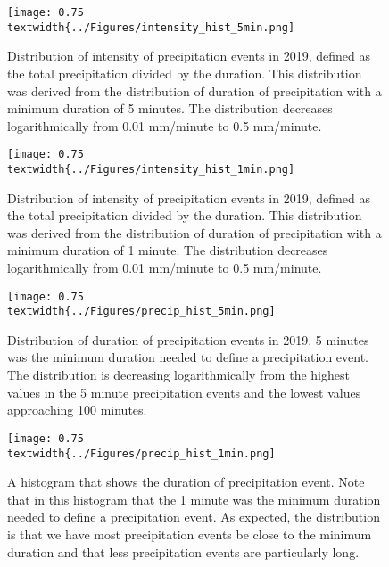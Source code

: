 %

\begin{figure}[h]
\centering
\texttt{[image: 0.75\\textwidth\{../Figures/intensity\_hist\_5min.png]}
\caption{\label{abc}Distribution of intensity of precipitation events in 2019,
defined as the total precipitation divided by the duration. This
distribution was derived from the distribution of duration of
precipitation with a minimum duration of 5 minutes. The distribution
decreases logarithmically from 0.01 mm/minute to 0.5 mm/minute.} 
\end{figure}
\vfill
\begin{figure}[h]
\centering
\texttt{[image: 0.75\\textwidth\{../Figures/intensity\_hist\_1min.png]}
\caption{\label{abcd}Distribution of intensity of precipitation events in 2019,
defined as the total precipitation divided by the duration. This
distribution was derived from the distribution of duration of
precipitation with a minimum duration of 1 minute. The distribution
decreases logarithmically from 0.01 mm/minute to 0.5 mm/minute.} 
\end{figure}
\vfill
\begin{figure}[h]
\centering\texttt{[image: 0.75\\textwidth\{../Figures/precip\_hist\_5min.png]} 
\caption{\label{abce}Distribution
of duration of precipitation events in 2019. 5 minutes was the minimum
duration needed to define a precipitation event. The distribution is
decreasing logarithmically from the highest values in the 5 minute
precipitation events and the lowest values approaching 100 minutes.}
\end{figure}
\begin{figure}[h]
\centering
\texttt{[image: 0.75\\textwidth\{../Figures/precip\_hist\_1min.png]}
\caption{\label{abcf}A histogram that shows the duration of precipitation
event. Note that in this histogram that the 1 minute was the minimum
duration needed to define a precipitation event. As expected, the
distribution is that we have most precipitation events be close to the
minimum duration and that less precipitation events are particularly
long. } 
\end{figure}
